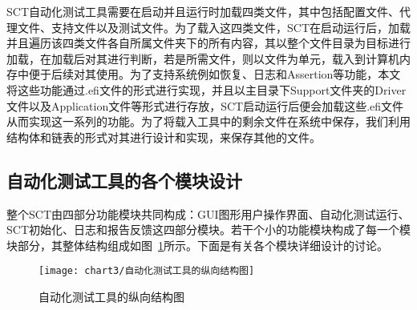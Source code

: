 \begin{itemize}
				SCT自动化测试工具需要在启动并且运行时加载四类文件，其中包括配置文件、代理文件、支持文件以及测试文件。为了载入这四类文件，SCT在启动运行后，加载并且遍历该四类文件各自所属文件夹下的所有内容，其以整个文件目录为目标进行加载，在加载后对其进行判断，若是所需文件，则以文件为单元，载入到计算机内存中便于后续对其使用。为了支持系统例如恢复、日志和Assertion等功能，本文将这些功能通过.efi文件的形式进行实现，并且以主目录下Support文件夹的Driver文件以及Application文件等形式进行存放，SCT启动运行后便会加载这些.efi文件从而实现这一系列的功能。为了将载入工具中的剩余文件在系统中保存，我们利用结构体和链表的形式对其进行设计和实现，来保存其他的文件。
		\end{itemize}
	\subsection{自动化测试工具的各个模块设计}
		
		整个SCT由四部分功能模块共同构成：GUI图形用户操作界面、自动化测试运行、SCT初始化、日志和报告反馈这四部分模块。若干个小的功能模块构成了每一个模块部分，其整体结构组成如图~\ref{fig:自动化测试工具的纵向结构图}所示。下面是有关各个模块详细设计的讨论。
		
		\begin{figure}[H] %
			\centering
			\texttt{[image: chart3/自动化测试工具的纵向结构图]}
			\caption{自动化测试工具的纵向结构图}
			\label{fig:自动化测试工具的纵向结构图}
		\end{figure}
		
